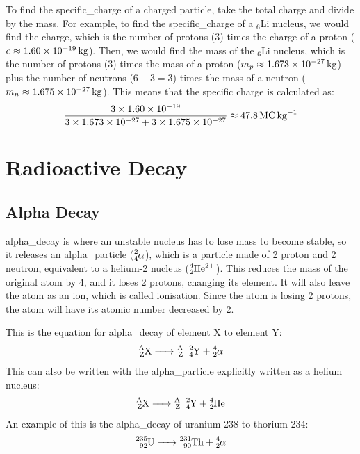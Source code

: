             To find the \gls{specific_charge} of a charged particle, take the total charge and divide by the mass.
            For example, to find the \gls{specific_charge} of a $_6$Li \gls{nucleus}, we would find the charge, which is the number of \glspl{proton} (3) times the charge of a \gls{proton} ($e\approx1.60\times10^{-19}\,\text{kg}$).
            Then, we would find the mass of the $_6$Li \gls{nucleus}, which is the number of \glspl{proton} (3) times the mass of a \gls{proton} ($m_p\approx1.673\times10^{-27}\,\text{kg}$) plus the number of \glspl{neutron} ($6-3=3$) times the mass of a \gls{neutron} ($m_n\approx1.675\times10^{-27}\,\text{kg}$).
            This means that the specific charge is calculated as:
            \begin{equation}
                \frac{3\times1.60\times10^{-19}}{3\times1.673\times10^{-27}+3\times1.675\times10^{-27}}\approx47.8\,\text{MC\,kg}^{-1}
            \end{equation}

    \newpage

\section{Radioactive Decay}
    \subsection{Alpha Decay} \label{alpha_decay}
        \Gls{alpha_decay} is where an unstable \gls{nucleus} has to lose mass to become stable, so it releases an \gls{alpha_particle} ($\ce{^2_4{\alphaparticle}}$), which is a particle made of 2 \gls{proton} and 2 \gls{neutron}, equivalent to a helium-2 \gls{nucleus} ($\ce{^4_2He^{2+}}$).
        This reduces the mass of the original \gls{atom} by 4, and it loses 2 \glspl{proton}, changing its element.
        It will also leave the \gls{atom} as an \gls{ion}, which is called ionisation.
        Since the \gls{atom} is losing 2 \glspl{proton}, the \gls{atom} will have its atomic number decreased by 2.

        This is the equation for \gls{alpha_decay} of element X to element Y:
        \begin{equation}
            \ce{_Z^AX -> _{Z-4}^{A-2}Y + ^4_2{\alphaparticle}}
        \end{equation}
        This can also be written with the \gls{alpha_particle} explicitly written as a helium \gls{nucleus}:
        \begin{equation}
            \ce{_Z^AX -> _{Z-4}^{A-2}Y + ^4_2He}
        \end{equation}
        An example of this is the \gls{alpha_decay} of uranium-238 to thorium-234:
        \begin{equation}
            \ce{_92^235U -> _90^231Th + ^4_2{\alphaparticle}}
        \end{equation}

